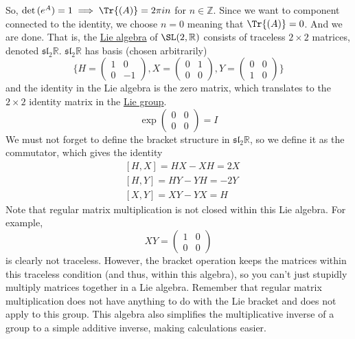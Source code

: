   So, $\det{(e^A)} = 1 \implies \Tr{(A)} = 2 \pi i n$ for $n \in \mathbb{Z}$. Since we want to component connected to the identity, we choose $n=0$ meaning that $\Tr{(A)} = 0$. And we are done. That is, the \hyperref[def:lie-algebra]{Lie algebra} of $\SL(2, \mathbb{R})$ consists of traceless $2 \times 2$ matrices, denoted $\mathfrak{sl}_2 \mathbb{R}$. $\mathfrak{sl}_2 \mathbb{R}$ has basis (chosen arbitrarily) 
  \begin{equation}
    \bigg\{ H = \begin{pmatrix}
    1&0\\0&-1
    \end{pmatrix}, X = \begin{pmatrix}
    0&1\\0&0
    \end{pmatrix}, Y = \begin{pmatrix}
    0&0\\1&0
    \end{pmatrix}\bigg\}
  \end{equation}
  and the identity in the Lie algebra is the zero matrix, which translates to the $2 \times 2$ identity matrix in the \hyperref[def:lie-group]{Lie group}. 
  \begin{equation}
    \exp \begin{pmatrix}
    0&0\\0&0
    \end{pmatrix} = I
  \end{equation}
  We must not forget to define the bracket structure in $\mathfrak{sl}_2 \mathbb{R}$, so we define it as the commutator, which gives the identity
  \begin{align*}
    & [H,X] = HX - XH = 2X \\
    & [H,Y] = HY - YH = -2Y \\
    & [X,Y] = XY - YX = H
  \end{align*}
  Note that regular matrix multiplication is not closed within this Lie algebra. For example, 
  \begin{equation}
    X Y = \begin{pmatrix}
    1&0\\0&0
    \end{pmatrix}
  \end{equation}
  is clearly not traceless. However, the bracket operation keeps the matrices within this traceless condition (and thus, within this algebra), so you can't just stupidly multiply matrices together in a Lie algebra. Remember that regular matrix multiplication does not have anything to do with the Lie bracket and does not apply to this group. This algebra also simplifies the multiplicative inverse of a group to a simple additive inverse, making calculations easier. 

